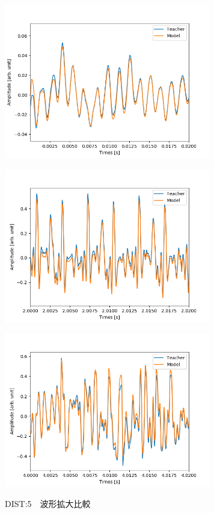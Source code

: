 \documentclass{jreport}		%
\begin{document}
\begin{figure}[htbp]
\begin{minipage}{0.5\hsize}
\begin{center}
 \end{center}
 \label{fig:one}
 \end{minipage}
 \begin{minipage}{0.5\hsize}
 \begin{center}
  \includegraphics[width=90mm]{gain5_output_hikaku4.png}
 \end{center}
 \label{fig:two}
 \end{minipage}
 \begin{minipage}{0.5\hsize}
 \begin{center}
  \includegraphics[width=90mm]{gain5_output_hikaku5.png}
 \end{center}
 \label{fig:one}
 \end{minipage}
 \begin{minipage}{0.5\hsize}
 \begin{center}
  \includegraphics[width=90mm]{gain5_output_hikaku6.png}
 \end{center}
 \label{fig:two}
 \end{minipage}
 \caption{DIST:5　波形拡大比較}
\end{figure}
\end{document}

